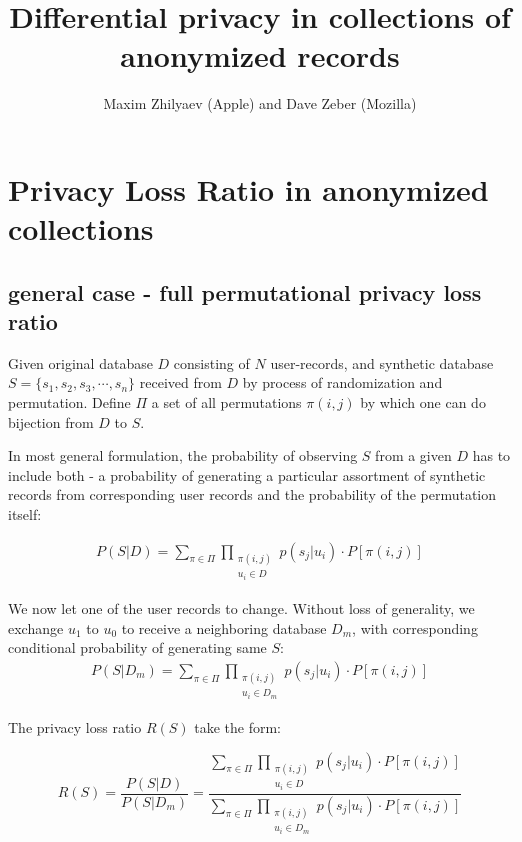 \documentclass[11pt]{article}
\title{Differential privacy in collections of anonymized records}
\author{Maxim Zhilyaev (Apple) and Dave Zeber (Mozilla)}
\begin{document}
\maketitle

\tableofcontents

\section{Privacy Loss Ratio in anonymized collections}

\subsection{general case - full permutational privacy loss ratio}

Given original database $D$ consisting of $N$  user-records, and synthetic database $S=\{s_1,s_2,s_3, \cdots, s_n\}$ received from $D$ by process of randomization and permutation.
Define $\Pi$ a set of all permutations $\pi(i,j)$ by which one can do bijection from $D$ to $S$.  

In most general formulation, the probability of observing $S$ from a given $D$ has to include both - a probability of generating a particular assortment of synthetic records from corresponding user records and the probability of the permutation itself:

\begin{align}
P(S|D) = \sum_{\pi \in \Pi} \prod_{\begin{matrix} \pi(i,j) \\ u_i \in D \end{matrix}}  p(s_j | u_i) \cdot P[\pi(i,j)]
\end{align}

We now let one of the user records to change. Without loss of generality, we exchange $u_1$ to $u_0$ to receive a neighboring database $D_m$, with corresponding conditional probability of generating  same $S$:
\begin{align}
P(S|D_m) = \sum_{\pi \in \Pi}  \prod_{\begin{matrix} \pi(i,j) \\ u_i \in D_m \end{matrix}}   p(s_j | u_i) \cdot P[\pi(i,j)]
\end{align}

The privacy loss ratio $R(S)$ take the form:

\begin{equation} \label{eq:totalPLR}
R(S) = \frac{P(S|D)}{ P(S|D_m)} = \frac{\sum_{\pi \in \Pi} \prod_{\begin{matrix} \pi(i,j) \\ u_i \in D \end{matrix}}  p(s_j | u_i) \cdot P[\pi(i,j)]} { \sum_{\pi \in \Pi}  \prod_{\begin{matrix} \pi(i,j) \\ u_i \in D_m \end{matrix}}   p(s_j | u_i) \cdot P[\pi(i,j)]}
\end{equation}
\end{document}
